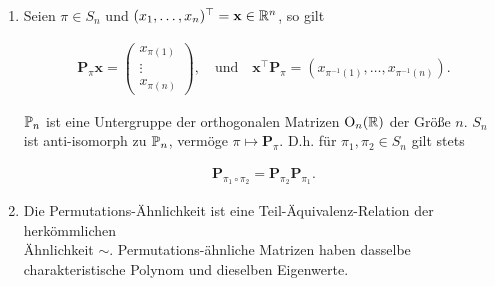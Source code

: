                 \begin{lemma} \label{lem:permutation_matrices}

                    \begin{enumerate}[
                        label = \arabic*.,
                        wide,
                        labelindent = 0pt
                    ]

                        \item Seien $\pi \in S_n$ und $(x_1, \dots, x_n)^\top = \mathbf x \in \R^n$, so gilt

                        \begin{align*}
                            \mathbf P_\pi \mathbf x
                            =
                            \begin{pmatrix}
                                x_{\pi(1)} \\ \vdots \\ x_{\pi(n)}
                            \end{pmatrix},
                            \quad
                            \text{und}
                            \quad
                            \mathbf x^\top \mathbf P_\pi
                            =
                            (x_{\pi^{-1}(1)}, \dots, x_{\pi^{-1}(n)}).
                        \end{align*}

                        $\P_n$ ist eine Untergruppe der orthogonalen Matrizen $\operatorname O_n(\R)$ der Größe $n$.
                        $S_n$ ist anti-isomorph zu $\P_n$, vermöge $\pi \mapsto \mathbf P_\pi$.
                        D.h. für $\pi_1, \pi_2 \in S_n$ gilt stets

                        \begin{align*}
                            \mathbf P_{\pi_1 \circ \pi_2}
                            =
                            \mathbf P_{\pi_2} \mathbf P_{\pi_1}.
                        \end{align*}

                        \item Die Permutations-Ähnlichkeit ist eine Teil-Äquivalenz-Relation der herkömmlichen \\ Ähnlichkeit $\sim$.
                        Permutations-ähnliche Matrizen haben dasselbe charakteristische Polynom und dieselben Eigenwerte.

                    \end{enumerate}

                \end{lemma}

